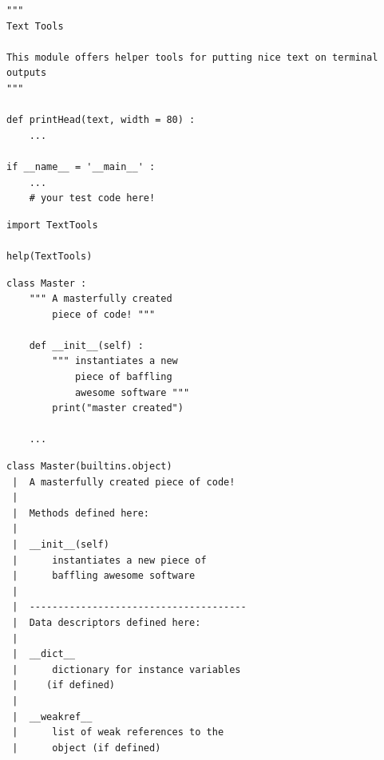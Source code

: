 
\begin{frame}[fragile]
%
\begin{codebox}
\begin{verbatim}
""" 
Text Tools

This module offers helper tools for putting nice text on terminal outputs
"""

def printHead(text, width = 80) :
    ...

if __name__ = '__main__' :
    ...
    # your test code here!
\end{verbatim}
\end{codebox}
%
\begin{codebox}
\begin{verbatim}
import TextTools

help(TextTools)
\end{verbatim}
\end{codebox}
%
\end{frame}


\begin{frame}[fragile]
%
\begin{tcbraster}[raster columns=2,
                  raster equal height,
                  nobeforeafter,
                  raster column skip=0.5cm]
\begin{codebox}
\begin{verbatim}
class Master :
    """ A masterfully created
        piece of code! """
    
    def __init__(self) :
        """ instantiates a new
            piece of baffling
            awesome software """
        print("master created")
    
    ...
\end{verbatim}
\end{codebox}
%
\begin{cmdbox}
\begin{verbatim}
class Master(builtins.object)
 |  A masterfully created piece of code!
 |  
 |  Methods defined here:
 |  
 |  __init__(self)
 |      instantiates a new piece of
 |      baffling awesome software
 |  
 |  --------------------------------------
 |  Data descriptors defined here:
 |  
 |  __dict__
 |      dictionary for instance variables
 |     (if defined)
 |  
 |  __weakref__
 |      list of weak references to the
 |      object (if defined)
\end{verbatim}
\end{cmdbox}
\end{tcbraster}
%
\end{frame}

